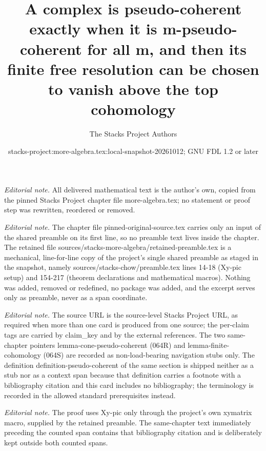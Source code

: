 \documentclass[10pt,a4paper]{amsart}
\title{A complex is pseudo-coherent exactly when it is m-pseudo-coherent for all m, and then its finite free resolution can be chosen to vanish above the top cohomology}
\author{The Stacks Project Authors}
\date{stacks-project:more-algebra.tex:local-snapshot-20261012; GNU FDL 1.2 or later}
\theoremstyle{plain}
\theoremstyle{definition}
\theoremstyle{remark}
\numberwithin{equation}{subsection}
\begin{document}
\maketitle
\setcounter{subsection}{1}
\noindent\textit{Editorial note.} All delivered mathematical text is the author's own, copied from the pinned Stacks Project chapter file more-algebra.tex; no statement or proof step was rewritten, reordered or removed.\par\medskip
\noindent\textit{Editorial note.} The chapter file pinned-original-source.tex carries only an input of the shared preamble on its first line, so no preamble text lives inside the chapter. The retained file sources/stacks-more-algebra/retained-preamble.tex is a mechanical, line-for-line copy of the project's single shared preamble as staged in the snapshot, namely sources/stacks-chow/preamble.tex lines 14-18 (Xy-pic setup) and 154-217 (theorem declarations and mathematical macros). Nothing was added, removed or redefined, no package was added, and the excerpt serves only as preamble, never as a span coordinate.\par\medskip
\noindent\textit{Editorial note.} The source URL is the source-level Stacks Project URL, as required when more than one card is produced from one source; the per-claim tags are carried by claim\_key and by the external references. The two same-chapter pointers lemma-cone-pseudo-coherent (064R) and lemma-finite-cohomology (064S) are recorded as non-load-bearing navigation stubs only. The definition definition-pseudo-coherent of the same section is shipped neither as a stub nor as a context span because that definition carries a footnote with a bibliography citation and this card includes no bibliography; the terminology is recorded in the allowed standard prerequisites instead.\par\medskip
\noindent\textit{Editorial note.} The proof uses Xy-pic only through the project's own xymatrix macro, supplied by the retained preamble. The same-chapter text immediately preceding the counted span contains that bibliography citation and is deliberately kept outside both counted spans.\par\medskip
\end{document}

